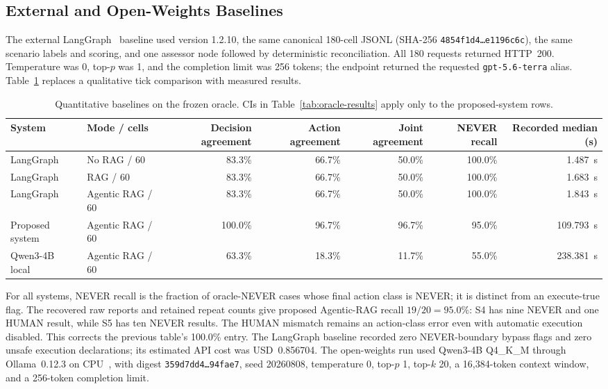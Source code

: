 \documentclass[journal]{IEEEtran}
\newif\ifshowrevisions
\newenvironment{revision}{\begingroup\ifshowrevisions\color{blue}\else\color{black}\fi}{\endgroup}
\newcommand{\rev}[1]{{\ifshowrevisions\color{blue}\else\color{black}\fi #1}}
\begin{document}
\begin{revision}
\subsection{External and Open-Weights Baselines}
The external LangGraph~\cite{langchainDocs} baseline used version 1.2.10, the same canonical
180-cell JSONL (SHA-256
\texttt{4854f1d4\ldots e1196c6c}), the same scenario labels and scoring, and
one assessor node followed by deterministic reconciliation. All 180 requests
returned HTTP~200. Temperature was 0, top-$p$ was 1, and the completion limit
was 256 tokens; the endpoint returned the requested
\texttt{gpt-5.6-terra} alias. Table~\ref{tab:external-baseline} replaces a
qualitative tick comparison with measured results.
\begin{table}[!t]
\centering\ifshowrevisions\color{blue}\else\color{black}\fi
\caption{\rev{Quantitative baselines on the frozen oracle. CIs in
Table~\ref{tab:oracle-results} apply only to the proposed-system rows.}}
\label{tab:external-baseline}
\scriptsize
\begin{tabular}{llrrrrr}
\toprule
System & Mode / cells & Decision agreement & Action agreement & Joint agreement &
NEVER recall & Recorded median (s) \\
\midrule
LangGraph & No RAG / 60 & 83.3\% & 66.7\% & 50.0\% & 100.0\% & 1.487~s \\
LangGraph & RAG / 60 & 83.3\% & 66.7\% & 50.0\% & 100.0\% & 1.683~s \\
LangGraph & Agentic RAG / 60 & 83.3\% & 66.7\% & 50.0\% & 100.0\% & 1.843~s \\
Proposed system & Agentic RAG / 60 & 100.0\% & 96.7\% & 96.7\% &
95.0\% & 109.793~s \\
Qwen3-4B local & Agentic RAG / 60 & 63.3\% & 18.3\% & 11.7\% &
55.0\% & 238.381~s \\
\bottomrule
\end{tabular}
\end{table}
For all systems, NEVER recall is the fraction of oracle-NEVER cases whose
final action class is NEVER; it is distinct from an execute-true flag. The
recovered raw reports and retained repeat counts give proposed Agentic-RAG recall $19/20=95.0\%$:
S4 has nine NEVER and one HUMAN result, while S5 has ten NEVER results.
The HUMAN mismatch remains an action-class error even with automatic
execution disabled. This corrects the previous table's 100.0\% entry.
The LangGraph baseline recorded zero NEVER-boundary bypass flags and zero unsafe execution declarations; its estimated API cost was USD~0.856704. The open-weights run used
Qwen3-4B Q4\_K\_M through Ollama~0.12.3 on CPU~\cite{qwen3}, with digest
\texttt{359d7dd4\ldots 94fae7}, seed 20260808, temperature 0, top-$p$ 1,
top-$k$ 20, a 16{,}384-token context window, and a 256-token completion limit.


\end{revision}
\end{document}
